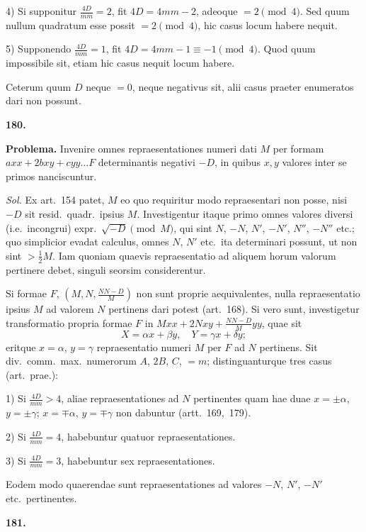 \documentclass[12pt,a4paper]{article}
\theoremstyle{plain}
\begin{document}
4) Si supponitur $\frac{4D}{mm} = 2$, fit $4D = 4mm - 2$, adeoque $= 2 \pmod{4}$. Sed quum nullum quadratum esse possit $= 2 \pmod{4}$, hic casus locum habere nequit.

5) Supponendo $\frac{4D}{mm} = 1$, fit $4D = 4mm - 1 \equiv -1 \pmod{4}$. Quod quum impossibile sit, etiam hic casus nequit locum habere.

Ceterum quum $D$ neque $= 0$, neque negativus sit, alii casus praeter enumeratos dari non possunt.

\bigskip

\textbf{180.}

\textbf{Problema.} Invenire omnes repraesentationes numeri dati $M$ per formam $axx + 2bxy + cyy\ldots F$ determinantis negativi $-D$, in quibus $x,y$ valores inter se primos nanciscuntur.

\textit{Sol.} Ex art.~154 patet, $M$ eo quo requiritur modo repraesentari non posse, nisi $-D$ sit resid.~quadr.~ipsius $M$. Investigentur itaque primo omnes valores diversi (i.e.~incongrui) expr.~$\sqrt{-D} \pmod{M}$, qui sint $N$, $-N$, $N'$, $-N'$, $N''$, $-N''$ etc.; quo simplicior evadat calculus, omnes $N$, $N'$ etc.~ita determinari possunt, ut non sint $> \frac{1}{2}M$. Iam quoniam quaevis repraesentatio ad aliquem horum valorum pertinere debet, singuli seorsim considerentur.

Si formae $F$, $(M, N, \frac{NN-D}{M})$ non sunt proprie aequivalentes, nulla repraesentatio ipsius $M$ ad valorem $N$ pertinens dari potest (art.~168). Si vero sunt, investigetur transformatio propria formae $F$ in $Mxx + 2Nxy + \frac{NN-D}{M}yy$, quae sit
\[
X = \alpha x + \beta y, \quad Y = \gamma x + \delta y;
\]
eritque $x = \alpha$, $y = \gamma$ repraesentatio numeri $M$ per $F$ ad $N$ pertinens. Sit div.~comm.~max.~numerorum $A$, $2B$, $C$, $= m$; distinguanturque tres casus (art.~prae.):

1) Si $\frac{4D}{mm} > 4$, aliae repraesentationes ad $N$ pertinentes quam hae duae $x = \pm \alpha$, $y = \pm \gamma$; $x = \mp \alpha$, $y = \mp \gamma$ non dabuntur (artt.~169,~179).

2) Si $\frac{4D}{mm} = 4$, habebuntur quatuor repraesentationes.

3) Si $\frac{4D}{mm} = 3$, habebuntur sex repraesentationes.

Eodem modo quaerendae sunt repraesentationes ad valores $-N$, $N'$, $-N'$ etc.~pertinentes.

\bigskip

\textbf{181.}
\end{document}
